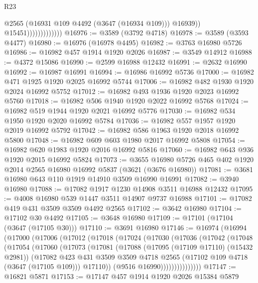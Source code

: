 \begin{lexlean}{R23}
\begin{coremodule}
                                  @2565
                                  (@16931 @109 @4492 (@3647 (@16934 @109)))
                                  @16939))
                              @15451)))))))))))))
@16976 := @3589 (@3792 @4718)
@16978 := @3589 (@3593 @4477)
@16980 := @16976 (@16978 @4495)
@16982 := @3763 @16980 @5726
@16986 := @16982 @457 @1914 @1920 @2026
@16987 := @3549 @14912
@16988 := @4372 @15086
@16990 := @2599 @16988 @12432
@16991 := @2632 @16990
@16992 := @16987 @16991
@16994 := @16986 @16992 @5736
@17000 := @16982 @471 @1925 @1920 @2025 @16992 @5744
@17006 := @16982 @482 @1930 @1920 @2024 @16992 @5752
@17012 := @16982 @493 @1936 @1920 @2023 @16992 @5760
@17018 := @16982 @506 @1940 @1920 @2022 @16992 @5768
@17024 := @16982 @519 @1944 @1920 @2021 @16992 @5776
@17030 := @16982 @534 @1950 @1920 @2020 @16992 @5784
@17036 := @16982 @557 @1957 @1920 @2019 @16992 @5792
@17042 := @16982 @586 @1963 @1920 @2018 @16992 @5800
@17048 := @16982 @609 @603 @1980 @2017 @16992 @5808
@17054 := @16982 @620 @1983 @1920 @2016 @16992 @5816
@17060 := @16982 @643 @936 @1920 @2015 @16992 @5824
@17073 := @3655 @16980 @5726 @465 @402 @1920 @2014 @2565 @16980 @16992 @5837 (@3621 (@3676 @16980))
@17081 := @3681 @16980 @643 @110 @1919 @14910 @3509 @16990 @16991
@17082 := @3940 @16980
@17088 := @17082 @1917 @1230 @14908 @3511 @16988 @12432
@17095 := @4008 @16980 @539 @1447 @3511 @14907 @9737 @16988
@17101 := @17082 @419 @431 @3509 @3509 @4492 @2565
@17102 := @3642 @16980
@17104 := @17102 @30 @4492
@17105 := @3648 @16980
@17109 := @17101 (@17104 (@3647 (@17105 @30)))
@17110 := @3691 @16980
@17146 := @16974
    (@16994
      (@17000
        (@17006
          (@17012
            (@17018
              (@17024
                (@17030
                  (@17036
                    (@17042
                      (@17048
                        (@17054
                          (@17060
                            (@17073
                              (@17081
                                (@17088
                                  (@17095 (@17109 @17110) (@15432 @2981))
                                  (@17082
                                    @423
                                    @431
                                    @3509
                                    @3509
                                    @4718
                                    @2565
                                    (@17102 @109 @4718 (@3647 (@17105 @109)))
                                    @17110))
                                (@9516 @16990)))))))))))))))
@17147 := @16821 @5871
@17153 := @17147 @457 @1914 @1920 @2026 @15384 @5879

\end{coremodule}
\end{lexlean}
